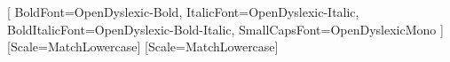 \usepackage[french]{babel}
\usepackage[utf8x]{inputenc}
\usepackage{lmodern} %

\usepackage{ifxetex}
\ifxetex
    \usepackage{fontspec}
    \setmainfont{OpenDyslexic}
    [
      BoldFont=OpenDyslexic-Bold,
      ItalicFont=OpenDyslexic-Italic,
      BoldItalicFont=OpenDyslexic-Bold-Italic,
      SmallCapsFont=OpenDyslexicMono
    ]
    \setsansfont{OpenDyslexic}[Scale=MatchLowercase]
    \setmonofont{OpenDyslexicMono}[Scale=MatchLowercase]
\else
    \usepackage[T1]{fontenc}
\fi

\usepackage{amsmath}
\usepackage{amsfonts}
\usepackage{latexsym}

\usepackage{amsthm}

\usepackage{authoraftertitle}

\usepackage{datetime}

\usepackage{hyperref}

\usepackage{subcaption}

\usepackage{multirow}
\usepackage[table]{xcolor}
\usepackage{tabularx}
\usepackage{longtable}
\usepackage{float}
\usepackage{array}

\usepackage{xcolor}

\usepackage{multicol}
\usepackage{xspace}

\usepackage{titlesec}

\usepackage{graphicx}

\usepackage{bookmark}

\usepackage[pdf]{graphviz}


\usepackage{magictex}
